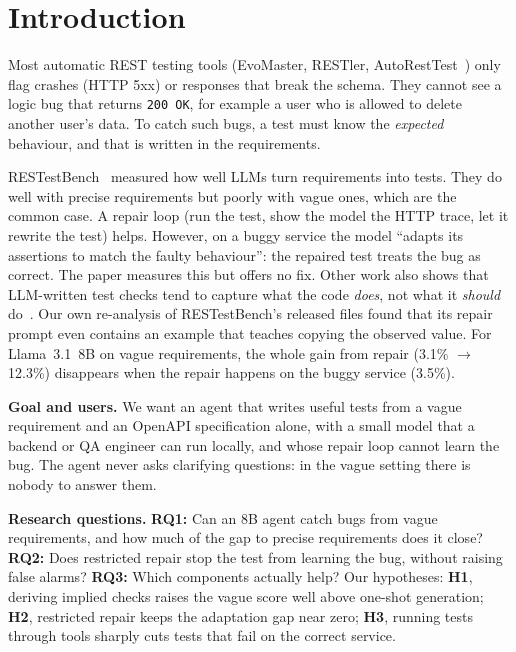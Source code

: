 \documentclass[11pt,a4paper]{article}
\begin{document}
\section{Introduction}
Most automatic REST testing tools (EvoMaster, RESTler, AutoRestTest~\cite{autoresttest}) only flag crashes (HTTP 5xx) or responses that break the schema. They cannot see a logic bug that returns \texttt{200~OK}, for example a user who is allowed to delete another user's data. To catch such bugs, a test must know the \emph{expected} behaviour, and that is written in the requirements.

RESTestBench~\cite{restestbench} measured how well LLMs turn requirements into tests. They do well with precise requirements but poorly with vague ones, which are the common case. A repair loop (run the test, show the model the HTTP trace, let it rewrite the test) helps. However, on a buggy service the model ``adapts its assertions to match the faulty behaviour'': the repaired test treats the bug as correct. The paper measures this but offers no fix. Other work also shows that LLM-written test checks tend to capture what the code \emph{does}, not what it \emph{should} do~\cite{konstantinou}. Our own re-analysis of RESTestBench's released files found that its repair prompt even contains an example that teaches copying the observed value. For Llama~3.1~8B on vague requirements, the whole gain from repair (3.1\% $\to$ 12.3\%) disappears when the repair happens on the buggy service (3.5\%).

\textbf{Goal and users.} We want an agent that writes useful tests from a vague requirement and an OpenAPI specification alone, with a small model that a backend or QA engineer can run locally, and whose repair loop cannot learn the bug. The agent never asks clarifying questions: in the vague setting there is nobody to answer them.

\textbf{Research questions.}
\textbf{RQ1:} Can an 8B agent catch bugs from vague requirements, and how much of the gap to precise requirements does it close?
\textbf{RQ2:} Does restricted repair stop the test from learning the bug, without raising false alarms?
\textbf{RQ3:} Which components actually help?
Our hypotheses: \textbf{H1}, deriving implied checks raises the vague score well above one-shot generation; \textbf{H2}, restricted repair keeps the adaptation gap near zero; \textbf{H3}, running tests through tools sharply cuts tests that fail on the correct service.
\end{document}
